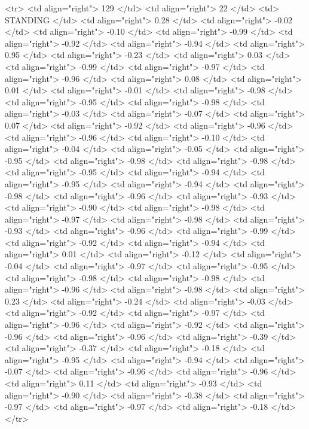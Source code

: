   <tr> <td align="right"> 129 </td> <td align="right">  22 </td> <td> STANDING </td> <td align="right"> 0.28 </td> <td align="right"> -0.02 </td> <td align="right"> -0.10 </td> <td align="right"> -0.99 </td> <td align="right"> -0.92 </td> <td align="right"> -0.94 </td> <td align="right"> 0.95 </td> <td align="right"> -0.23 </td> <td align="right"> 0.03 </td> <td align="right"> -0.99 </td> <td align="right"> -0.97 </td> <td align="right"> -0.96 </td> <td align="right"> 0.08 </td> <td align="right"> 0.01 </td> <td align="right"> -0.01 </td> <td align="right"> -0.98 </td> <td align="right"> -0.95 </td> <td align="right"> -0.98 </td> <td align="right"> -0.03 </td> <td align="right"> -0.07 </td> <td align="right"> 0.07 </td> <td align="right"> -0.92 </td> <td align="right"> -0.96 </td> <td align="right"> -0.96 </td> <td align="right"> -0.10 </td> <td align="right"> -0.04 </td> <td align="right"> -0.05 </td> <td align="right"> -0.95 </td> <td align="right"> -0.98 </td> <td align="right"> -0.98 </td> <td align="right"> -0.95 </td> <td align="right"> -0.94 </td> <td align="right"> -0.95 </td> <td align="right"> -0.94 </td> <td align="right"> -0.98 </td> <td align="right"> -0.96 </td> <td align="right"> -0.93 </td> <td align="right"> -0.90 </td> <td align="right"> -0.98 </td> <td align="right"> -0.97 </td> <td align="right"> -0.98 </td> <td align="right"> -0.93 </td> <td align="right"> -0.96 </td> <td align="right"> -0.99 </td> <td align="right"> -0.92 </td> <td align="right"> -0.94 </td> <td align="right"> 0.01 </td> <td align="right"> -0.12 </td> <td align="right"> -0.04 </td> <td align="right"> -0.97 </td> <td align="right"> -0.95 </td> <td align="right"> -0.98 </td> <td align="right"> -0.98 </td> <td align="right"> -0.96 </td> <td align="right"> -0.98 </td> <td align="right"> 0.23 </td> <td align="right"> -0.24 </td> <td align="right"> -0.03 </td> <td align="right"> -0.92 </td> <td align="right"> -0.97 </td> <td align="right"> -0.96 </td> <td align="right"> -0.92 </td> <td align="right"> -0.96 </td> <td align="right"> -0.96 </td> <td align="right"> -0.39 </td> <td align="right"> -0.37 </td> <td align="right"> -0.18 </td> <td align="right"> -0.95 </td> <td align="right"> -0.94 </td> <td align="right"> -0.07 </td> <td align="right"> -0.96 </td> <td align="right"> -0.96 </td> <td align="right"> 0.11 </td> <td align="right"> -0.93 </td> <td align="right"> -0.90 </td> <td align="right"> -0.38 </td> <td align="right"> -0.97 </td> <td align="right"> -0.97 </td> <td align="right"> -0.18 </td> </tr>
